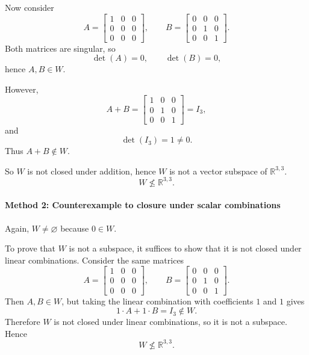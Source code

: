 \documentclass[12pt]{article}
\newcommand{\R}{\mathbb{R}}
\begin{document}
Now consider
\[
A=\begin{bmatrix}1&0&0\\0&0&0\\0&0&0\end{bmatrix},
\qquad
B=\begin{bmatrix}0&0&0\\0&1&0\\0&0&1\end{bmatrix}.
\]
Both matrices are singular, so
\[
\det(A)=0,\qquad \det(B)=0,
\]
hence \(A,B\in W\).

However,
\[
A+B=
\begin{bmatrix}
1&0&0\\
0&1&0\\
0&0&1
\end{bmatrix}
=I_3,
\]
and
\[
\det(I_3)=1\neq 0.
\]
Thus \(A+B\notin W\).

So \(W\) is not closed under addition, hence \(W\) is not a vector subspace of \(\R^{3,3}\).
\[
\boxed{W\not\le \R^{3,3}.}
\]

\paragraph{Method 2: Counterexample to closure under scalar combinations}
Again, \(W\neq\varnothing\) because \(0\in W\).

To prove that \(W\) is not a subspace, it suffices to show that it is not closed under linear combinations. Consider the same matrices
\[
A=\begin{bmatrix}1&0&0\\0&0&0\\0&0&0\end{bmatrix},
\qquad
B=\begin{bmatrix}0&0&0\\0&1&0\\0&0&1\end{bmatrix}.
\]
Then \(A,B\in W\), but taking the linear combination with coefficients \(1\) and \(1\) gives
\[
1\cdot A+1\cdot B=I_3\notin W.
\]
Therefore \(W\) is not closed under linear combinations, so it is not a subspace. Hence
\[
\boxed{W\not\le \R^{3,3}.}
\]
\end{document}
